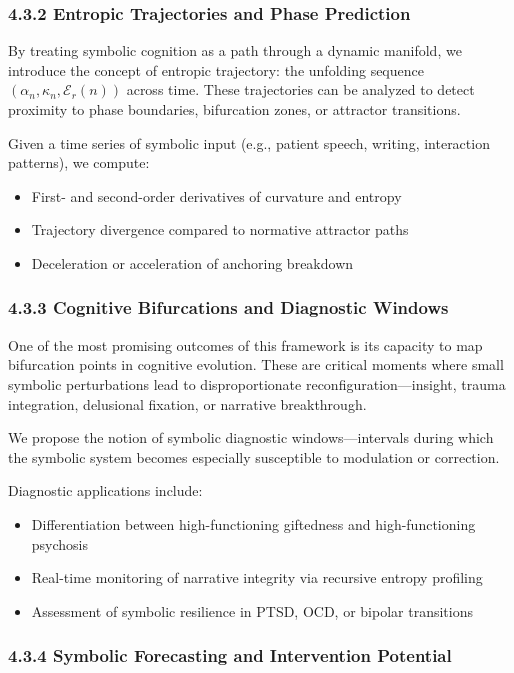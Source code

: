 \subsubsection*{4.3.2 Entropic Trajectories and Phase Prediction}

By treating symbolic cognition as a path through a dynamic manifold, we introduce the concept of entropic trajectory: the unfolding sequence $(\alpha_n, \kappa_n, \mathcal{E}_r(n))$ across time. These trajectories can be analyzed to detect proximity to phase boundaries, bifurcation zones, or attractor transitions.

Given a time series of symbolic input (e.g., patient speech, writing, interaction patterns), we compute:
\begin{itemize}
\item First- and second-order derivatives of curvature and entropy
\item Trajectory divergence compared to normative attractor paths
\item Deceleration or acceleration of anchoring breakdown
\end{itemize}

\subsubsection*{4.3.3 Cognitive Bifurcations and Diagnostic Windows}

One of the most promising outcomes of this framework is its capacity to map bifurcation points in cognitive evolution. These are critical moments where small symbolic perturbations lead to disproportionate reconfiguration—insight, trauma integration, delusional fixation, or narrative breakthrough.

We propose the notion of symbolic diagnostic windows—intervals during which the symbolic system becomes especially susceptible to modulation or correction.

Diagnostic applications include:
\begin{itemize}
\item Differentiation between high-functioning giftedness and high-functioning psychosis
\item Real-time monitoring of narrative integrity via recursive entropy profiling
\item Assessment of symbolic resilience in PTSD, OCD, or bipolar transitions
\end{itemize}

\subsubsection*{4.3.4 Symbolic Forecasting and Intervention Potential}

